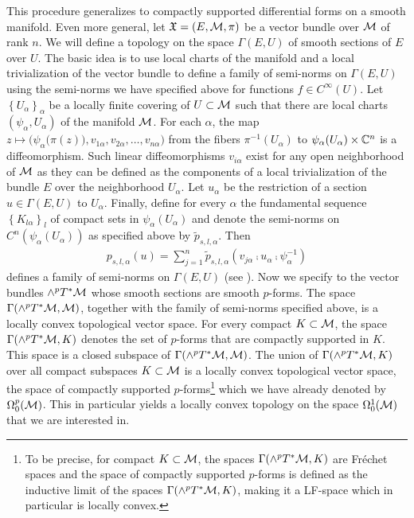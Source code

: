 This procedure generalizes to compactly supported differential forms on a smooth mani\-fold. Even more general, let $\mathfrak{X}=(E, \mathcal{M},\pi)$ be a vector bundle over $\mathcal{M}$ of rank $n$. We will define a topology on the space $\Gamma(E,U)$ of smooth sections of $E$ over $U$. The basic idea is to use local charts of the manifold and a local trivialization of the vector bundle to define a family of semi-norms on $\Gamma(E,U)$ using the semi-norms we have specified above for functions $f\in C^\infty(U)$. Let $\left\{U_\alpha\right\}_\alpha$ be a locally finite covering of $U \subset \mathcal{M}$ such that there are local charts $(\psi_\alpha, U_\alpha)$ of the manifold $\mathcal{M}$. For each $\alpha$, the map $z \mapsto \Big( \psi_\alpha\big(\pi(z)\big) , v_{1\alpha} , v_{2 \alpha} , \dots , v_{n \alpha} \Big)$ from the fibers $\pi^{-1} (U_\alpha)$ to $\psi_\alpha (U_\alpha) \times \mathbb{C}^n$ is a diffeomorphism. Such linear diffeomorphisms $v_{i\alpha}$ exist for any open neighborhood of $\mathcal{M}$ as they can be defined as the components of a local trivialization of the bundle $E$ over the neighborhood $U_\alpha$.  Let $u_\alpha$ be the restriction of a section $u \in \Gamma(E,U)$ to $U_\alpha$. Finally, define for every $\alpha$ the fundamental sequence  $\left\{ K_{l\alpha} \right\}_l$ of compact sets in $\psi_\alpha(U_\alpha)$ and denote the semi-norms on $C^n(\psi_\alpha(U_\alpha))$ as specified above by $\tilde{p}_{s, l, \alpha}$. Then
\begin{align}
	p_{s,l,\alpha}(u) = \sum_{j=1}^{n} \tilde{p}_{s, l, \alpha} \left( v_{j\alpha} \comp u_\alpha \comp \psi^{-1}_\alpha \right)
\end{align}
defines a family of semi-norms on $\Gamma(E,U)$ (see \cite[Equation 17.2.1]{dieudonne_2}). Now we specify to the vector bundles $\wedge^p T^* \mathcal{M}$ whose smooth sections are smooth $p$-forms. The space $\Gamma(\wedge^p T^* \mathcal{M} , \mathcal{M})$, together with the family of semi-norms specified above, is a locally convex topological vector space. For every compact $K \subset \mathcal{M}$, the space $\Gamma(\wedge^p T^* \mathcal{M},K)$ denotes the set of $p$-forms that are compactly supported in $K$. This space is a closed subspace of $\Gamma(\wedge^p T^* \mathcal{M},\mathcal{M})$. The union of $\Gamma(\wedge^p T^* \mathcal{M},K)$ over all compact subspaces $K \subset \mathcal{M}$ is a locally convex topological vector space, the space of compactly supported $p$-forms\footnote{To be precise, for compact $K \subset \mathcal{M}$, the spaces $\Gamma(\wedge^p T^* \mathcal{M}, K)$ are Fr\'echet spaces \cite[Theorem 17.2.2]{dieudonne_3} and the space of compactly supported $p$-forms is defined as the inductive limit of the spaces $\Gamma(\wedge^p T^* \mathcal{M},K)$, making it a LF-space which in particular is locally convex.} which we have already denoted by $\Omega^p_0 (\mathcal{M})$. This in particular yields a locally convex topology on the space $\Omega^1_0(\mathcal{M})$ that we are interested in.\par
